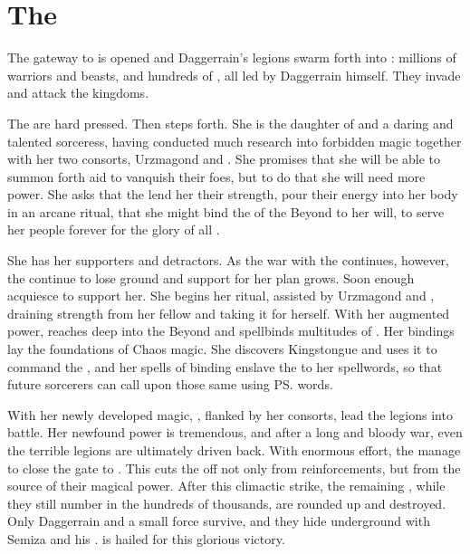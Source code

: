 \section{The \Banewar}
The gateway to \Erebos{} is opened and Daggerrain's legions swarm forth into \Miith{}: millions of \bane{} warriors and beasts, and hundreds of \banelords, all led by Daggerrain himself. They invade and attack the \draconic{} kingdoms. 

The \dragons{} are hard pressed. Then \TyarithXserasshana{} steps forth. She is the daughter of \HesodN{} and a daring and talented sorceress, having conducted much research into forbidden magic together with her two consorts, Urzmagond and \ApepNesthra. She promises that she will be able to summon forth aid to vanquish their foes, but to do that she will need more power. She asks that the \dragons{} lend her their strength, pour their energy into her body in an arcane ritual, that she might bind the \daemons{} of the Beyond to her will, to serve her people forever for the glory of all \Dragonkind. 

She has her supporters and detractors. As the war with the \leviathans{} continues, however, the \dragons{} continue to lose ground and support for her plan grows. Soon enough \dragons{} acquiesce to support her. She begins her ritual, assisted by Urzmagond and \ApepNesthra, draining strength from her fellow \dragons{} and taking it for herself. With her augmented power, \Xserasshana{} reaches deep into the Beyond and spellbinds multitudes of \daemons. Her bindings lay the foundations of Chaos magic. She discovers Kingstongue and uses it to command the \daemons, and her spells of binding enslave the \daemons{} to her spellwords, so that future sorcerers can call upon those same \daemons{} using \ps{\Xserasshana}{} words. 

With her newly developed magic, \Xserasshana{}, flanked by her consorts, lead the \draconic{} legions into battle. Her newfound power is tremendous, and after a long and bloody war, even the terrible \bane{} legions are ultimately driven back. With enormous effort, the \dragons{} manage to close the gate to \Erebos{}. This cuts the \banes{} off not only from reinforcements, but from the source of their magical power. After this climactic strike, the remaining \banes{}, while they still number in the hundreds of thousands, are rounded up and destroyed. Only Daggerrain and a small force survive, and they hide underground with Semiza and his \nephilim. 
\Xserasshana{} is hailed for this glorious victory. 

